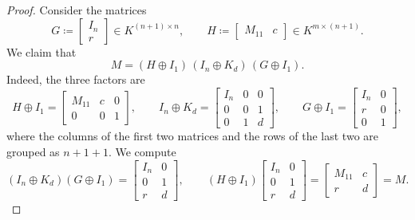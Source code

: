 \documentclass[11pt,a4paper]{article}
\theoremstyle{plain}
\theoremstyle{definition}
\theoremstyle{remark}
\begin{document}
\begin{proof}
    Consider the matrices
    \begin{equation*}
        G \coloneqq \begin{bmatrix} I_n \\ r \end{bmatrix} \in K^{(n+1) \times n},
        \qquad
        H \coloneqq \begin{bmatrix} M_{11} & c \end{bmatrix} \in K^{m \times (n+1)} .
    \end{equation*}
    We claim that
    \begin{equation}
        \label{eq:factorization}
        M = (H \oplus I_1)\, (I_n \oplus K_d)\, (G \oplus I_1) .
    \end{equation}
    Indeed, the three factors are
    \begin{equation*}
        H \oplus I_1 = \begin{bmatrix} M_{11} & c & 0 \\ 0 & 0 & 1 \end{bmatrix},
        \qquad
        I_n \oplus K_d = \begin{bmatrix} I_n & 0 & 0 \\ 0 & 0 & 1 \\ 0 & 1 & d \end{bmatrix},
        \qquad
        G \oplus I_1 = \begin{bmatrix} I_n & 0 \\ r & 0 \\ 0 & 1 \end{bmatrix},
    \end{equation*}
    where the columns of the first two matrices and the rows of the last two are grouped as $n + 1 + 1$.
    We compute
    \begin{equation*}
        (I_n \oplus K_d)(G \oplus I_1) = \begin{bmatrix} I_n & 0 \\ 0 & 1 \\ r & d \end{bmatrix},
        \qquad
        (H \oplus I_1) \begin{bmatrix} I_n & 0 \\ 0 & 1 \\ r & d \end{bmatrix} = \begin{bmatrix} M_{11} & c \\ r & d \end{bmatrix} = M .
    \end{equation*}

\end{proof}
\end{document}
